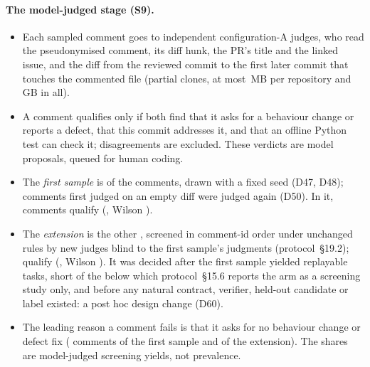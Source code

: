 \paragraph{The model-judged stage (S9).}
\begin{itemize}
\item Each sampled comment goes to  independent configuration-A judges, who read the pseudonymised
  comment, its diff hunk, the PR's title and the linked issue, and the diff from the reviewed commit to the first later commit that touches the commented
  file (partial clones, at most \,MB per repository and \,GB in all).
\item A comment qualifies only if both find that it asks for a behaviour change or reports a defect, that this commit
  addresses it, and that an offline Python test can check it; disagreements are excluded. These verdicts are model
  proposals, queued for human coding.
\item The \emph{first sample} is  of the  comments, drawn with a fixed
  seed (D47, D48);  comments first judged on an empty diff were judged again (D50). In it,
   comments qualify (, Wilson ).
\item The \emph{extension} is the other , screened in comment-id order under unchanged rules by new
  judges blind to the first sample's judgments (protocol~\S19.2);  qualify (,
  Wilson ). It was decided after the first sample yielded  replayable tasks,
  short of the  below which protocol~\S15.6 reports the arm as a screening study only, and
  before any natural contract, verifier, held-out candidate or label existed: a post hoc design change (D60).
\item The leading reason a comment fails is that it asks for no behaviour change or defect fix
  ( comments of the first sample and  of the extension). The shares are model-judged screening
  yields, not prevalence.
\end{itemize}


